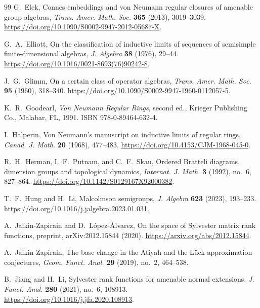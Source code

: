 \documentclass[11pt]{amsart}
\theoremstyle{definition}
\theoremstyle{remark}
\begin{document}
\begin{thebibliography}{99}
G.~Elek,
\newblock Connes embeddings and von Neumann regular closures of amenable group
  algebras,
\newblock \emph{Trans. Amer. Math. Soc.} \textbf{365} (2013), 3019--3039.
\newblock \url{https://doi.org/10.1090/S0002-9947-2012-05687-X}.

G.~A.~Elliott,
\newblock On the classification of inductive limits of sequences of
  semisimple finite-dimensional algebras,
\newblock \emph{J. Algebra} \textbf{38} (1976), 29--44.
\newblock \url{https://doi.org/10.1016/0021-8693(76)90242-8}.

J.~G.~Glimm,
\newblock On a certain class of operator algebras,
\newblock \emph{Trans. Amer. Math. Soc.} \textbf{95} (1960), 318--340.
\newblock \url{https://doi.org/10.1090/S0002-9947-1960-0112057-5}.

K.~R.~Goodearl,
\newblock \emph{Von Neumann Regular Rings},
\newblock second ed., Krieger Publishing Co., Malabar, FL, 1991.
\newblock ISBN 978-0-89464-632-4.

I.~Halperin,
\newblock Von Neumann's manuscript on inductive limits of regular rings,
\newblock \emph{Canad. J. Math.} \textbf{20} (1968), 477--483.
\newblock \url{https://doi.org/10.4153/CJM-1968-045-0}.

R.~H.~Herman, I.~F.~Putnam, and C.~F.~Skau,
\newblock Ordered Bratteli diagrams, dimension groups and topological dynamics,
\newblock \emph{Internat. J. Math.} \textbf{3} (1992), no.~6, 827--864.
\newblock \url{https://doi.org/10.1142/S0129167X92000382}.

T.~F.~Hung and H.~Li,
\newblock Malcolmson semigroups,
\newblock \emph{J. Algebra} \textbf{623} (2023), 193--233.
\newblock \url{https://doi.org/10.1016/j.jalgebra.2023.01.031}.

A.~Jaikin-Zapirain and D.~L\'opez-\'Alvarez,
\newblock On the space of Sylvester matrix rank functions,
\newblock preprint, arXiv:2012.15844 (2020).
\newblock \url{https://arxiv.org/abs/2012.15844}.

A.~Jaikin-Zapirain,
\newblock The base change in the Atiyah and the L\"uck approximation conjectures,
\newblock \emph{Geom. Funct. Anal.} \textbf{29} (2019), no.~2, 464--538.

B.~Jiang and H.~Li,
\newblock Sylvester rank functions for amenable normal extensions,
\newblock \emph{J. Funct. Anal.} \textbf{280} (2021), no.~6, 108913.
\newblock \url{https://doi.org/10.1016/j.jfa.2020.108913}.


\end{thebibliography}
\end{document}
